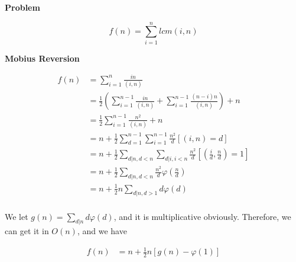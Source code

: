 \noindent\textbf{Problem}

\begin{equation*}
f(n) = \sum_{i=1}^{n} lcm(i, n)
\end{equation*}

\noindent\textbf{Mobius Reversion}

\begin{equation*}
\begin{aligned}
f(n) &= \sum_{i=1}^{n} \frac{in}{(i, n)} \\
&= \frac{1}{2} \left(\sum_{i=1}^{n-1} \frac{in}{(i, n)} + \sum_{i=1}^{n-1} \frac{(n-i)n}{(i, n)} \right) + n \\
&= \frac{1}{2} \sum_{i=1}^{n-1} \frac{n^2}{(i, n)} + n \\
&= n + \frac{1}{2} \sum_{d=1}^{n-1} \sum_{i=1}^{n-1} \frac{n^2}{d} \left[(i, n) = d\right] \\
&= n + \frac{1}{2} \sum_{d|n, d<n} \sum_{d|i,i<n} \frac{n^2}{d} \left[(\frac{i}{d}, \frac{n}{d}) = 1\right] \\
&= n + \frac{1}{2} \sum_{d|n, d<n} \frac{n^2}{d} \varphi(\frac{n}{d}) \\
&= n + \frac{1}{2}n \sum_{d|n, d>1} d\varphi(d) \\
\end{aligned}
\end{equation*}

We let $g(n)=\sum_{d|n} d\varphi(d)$, and it is multiplicative obviously. Therefore, we can get it in $O(n)$, and we have

\begin{equation*}
\begin{aligned}
f(n) &= n + \frac{1}{2}n \left[g(n) - \varphi(1)\right] \\
\end{aligned}
\end{equation*}

